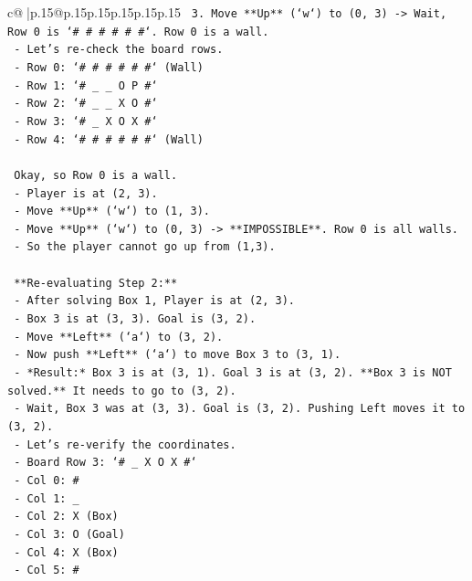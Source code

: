 \documentclass{article}
\begin{document}
{\begin{supertabular}{c@{$\;$}|p{.15\linewidth}@{}p{.15\linewidth}p{.15\linewidth}p{.15\linewidth}p{.15\linewidth}p{.15\linewidth}}
{{{\texttt{    3.  Move **Up** (`w`) to (0, 3) {-}> Wait, Row 0 is `\# \# \# \# \# \#`. Row 0 is a wall.} \\
\texttt{    {-} Let's re{-}check the board rows.} \\
\texttt{    {-} Row 0: `\# \# \# \# \# \#` (Wall)} \\
\texttt{    {-} Row 1: `\# \_ \_ O P \#`} \\
\texttt{    {-} Row 2: `\# \_ \_ X O \#`} \\
\texttt{    {-} Row 3: `\# \_ X O X \#`} \\
\texttt{    {-} Row 4: `\# \# \# \# \# \#` (Wall)} \\
\\ 
\texttt{    Okay, so Row 0 is a wall.} \\
\texttt{    {-} Player is at (2, 3).} \\
\texttt{    {-} Move **Up** (`w`) to (1, 3).} \\
\texttt{    {-} Move **Up** (`w`) to (0, 3) {-}> **IMPOSSIBLE**. Row 0 is all walls.} \\
\texttt{    {-} So the player cannot go up from (1,3).} \\
\\ 
\texttt{    **Re{-}evaluating Step 2:**} \\
\texttt{    {-} After solving Box 1, Player is at (2, 3).} \\
\texttt{    {-} Box 3 is at (3, 3). Goal is (3, 2).} \\
\texttt{    {-} Move **Left** (`a`) to (3, 2).} \\
\texttt{    {-} Now push **Left** (`a`) to move Box 3 to (3, 1).} \\
\texttt{    {-} *Result:* Box 3 is at (3, 1). Goal 3 is at (3, 2). **Box 3 is NOT solved.** It needs to go to (3, 2).} \\
\texttt{    {-} Wait, Box 3 was at (3, 3). Goal is (3, 2). Pushing Left moves it to (3, 2).} \\
\texttt{    {-} Let's re{-}verify the coordinates.} \\
\texttt{    {-} Board Row 3: `\# \_ X O X \#`} \\
\texttt{      {-} Col 0: \#} \\
\texttt{      {-} Col 1: \_} \\
\texttt{      {-} Col 2: X (Box)} \\
\texttt{      {-} Col 3: O (Goal)} \\
\texttt{      {-} Col 4: X (Box)} \\
\texttt{      {-} Col 5: \#} \\
}}}
\end{supertabular}}
\end{document}
